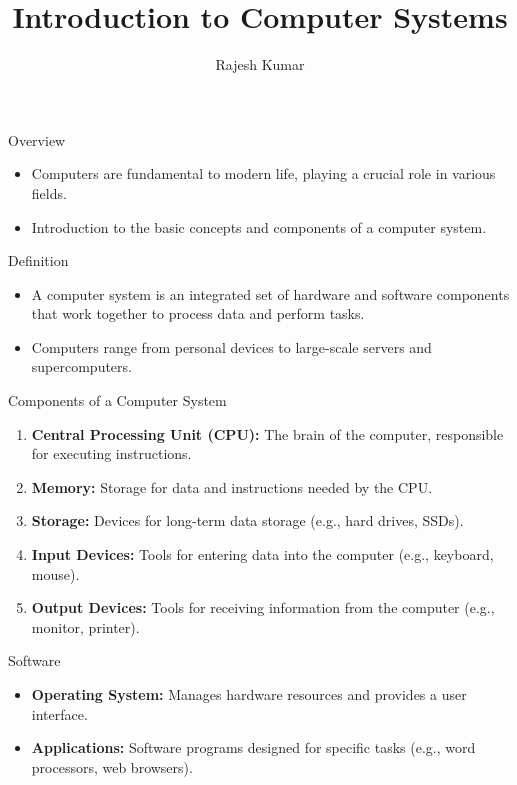 
\title{Introduction to Computer Systems}
\author{Rajesh Kumar}
\date{}

\begin{frame}
  \titlepage
\end{frame}

\begin{frame}{Overview}
  \begin{itemize}
    \item Computers are fundamental to modern life, playing a crucial role in various fields.
    \item Introduction to the basic concepts and components of a computer system.
  \end{itemize}
\end{frame}

\begin{frame}{Definition}
  \begin{itemize}
    \item A computer system is an integrated set of hardware and software components that work together to process data and perform tasks.
    \item Computers range from personal devices to large-scale servers and supercomputers.
  \end{itemize}
\end{frame}

\begin{frame}{Components of a Computer System}
  \begin{enumerate}
    \item \textbf{Central Processing Unit (CPU):} The brain of the computer, responsible for executing instructions.
    \item \textbf{Memory:} Storage for data and instructions needed by the CPU.
    \item \textbf{Storage:} Devices for long-term data storage (e.g., hard drives, SSDs).
    \item \textbf{Input Devices:} Tools for entering data into the computer (e.g., keyboard, mouse).
    \item \textbf{Output Devices:} Tools for receiving information from the computer (e.g., monitor, printer).
  \end{enumerate}
\end{frame}

\begin{frame}{Software}
  \begin{itemize}
    \item \textbf{Operating System:} Manages hardware resources and provides a user interface.
    \item \textbf{Applications:} Software programs designed for specific tasks (e.g., word processors, web browsers).
  \end{itemize}
\end{frame}

